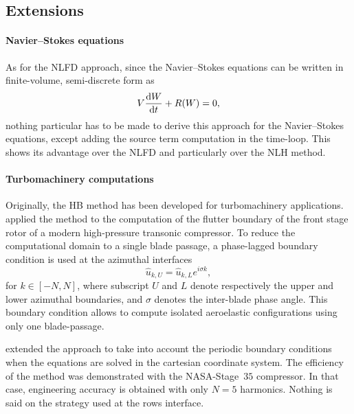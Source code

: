 \subsection{Extensions}
\label{sec:sm_hb_extension}

\paragraph{Navier--Stokes equations}
As for the NLFD approach, since the 
Navier--Stokes equations can be written in finite-volume,
semi-discrete form as
\begin{equation}
	V \frac{\mathop{}\!\mathrm{d} W}{\mathop{}\!\mathrm{d} t} + R(W) = 0,
\end{equation}
nothing particular has to be made to derive this approach for
the Navier--Stokes equations, except adding the source term computation
in the time-loop.
This shows its advantage over the NLFD and particularly over the NLH method.

\paragraph{Turbomachinery computations}
Originally, the HB method has been developed for 
turbomachinery applications.
\citet{Hall2002} applied the method to the computation
of the flutter boundary of the front stage rotor 
of a modern high-pressure transonic compressor. To reduce the
computational domain to a single blade passage, 
a phase-lagged boundary condition is used at the azimuthal
interfaces
\begin{equation}
	\widehat{u}_{k, U} = \widehat{u}_{k, L} e^{i \sigma k},
\end{equation}
for $k \in [-N, N]$, where subscript $U$ and $L$ denote
respectively the upper and lower azimuthal boundaries, and
$\sigma$ denotes the inter-blade phase angle. This boundary
condition allows to compute isolated aeroelastic configurations
using only one blade-passage.

 extended the approach to take into account
the periodic boundary conditions when the equations are solved in the
cartesian coordinate system. The efficiency of the
method was demonstrated with the NASA-Stage~$35$ compressor. In that case,
engineering accuracy is obtained with only $N=5$ harmonics.
Nothing is said on the strategy used at the rows interface.

